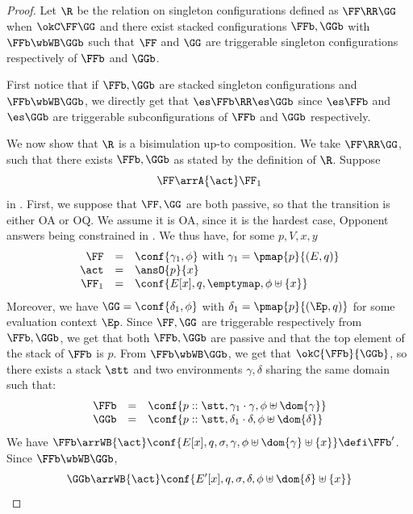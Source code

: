 \begin{proof}
  Let $\R$ be the relation on \AOGS singleton configurations
  defined as $\FF \RR \GG$ when
   $\okC \FF\GG$ and there exist stacked configurations $\FFb, \GGb$
    with $\FFb \wbWB \GGb$ such that 
    $\FF$ and $\GG$ are triggerable singleton configurations
    respectively of $\FFb$ and $\GGb$.

  First notice that if $\FFb, \GGb$ are stacked singleton configurations and 
  $\FFb \wbWB \GGb$, we directly get that 
  $\es\FFb \RR \es\GGb$ since $\es\FFb$ and $\es\GGb$ are 
  triggerable subconfigurations of $\FFb$ and $\GGb$ respectively.
  
  We now show that $\R$ is a bisimulation up-to composition.
  We take $\FF \RR \GG$, such that there exists $\FFb, \GGb$
  as stated by the definition of $\R$.
  Suppose 
  \begin{equation}
  \label{e:arrA-left}
   \FF \arrA{\act} \FF_1 
  \end{equation} 
  in \AOGS.  
  First, we suppose that $\FF,\GG$ are both passive, 
  so that the transition is either OA or OQ.  
  We assume it is OA, since it is the hardest case, 
  Opponent answers being constrained in \WBOGS.
  We thus have, for some $p,V,x,y$ 
  \[\begin{array}{rcl}
   \FF &=&  \conf{ \gamma_1, \phi} \mbox{ with }  \gamma_1 = \pmap{p}{(E,q)} \\
   \act & = & \ansO{p}{x} \\
   \FF_1 & = & \conf{E[x],q, \emptymap,\phi \uplus \{x\}}
  \end{array}\]
  Moreover, we have $\GG = \conf{\delta_1, \phi}$ 
  with $\delta_1 = \pmap{p}{(\Ep,q)}$ for some evaluation context $\Ep$.
  Since $\FF,\GG$ are triggerable respectively from $\FFb,\GGb$,
  we get that both $\FFb,\GGb$ are passive
  and that the top element of the stack of $\FFb$ is $p$.
  From $\FFb \wbWB \GGb$, we get that $\okC{\FFb}{\GGb}$,
  so there exists a stack $\stt$ and two environments $\gamma, \delta$ sharing the same domain such that:  
  \[\begin{array}{rcl}
  \FFb & = & \conf{p::\stt,\gamma_1 \cdot \gamma,\phi \uplus \dom{\gamma}} \\ 
  \GGb & = & \conf{p::\stt,\delta_1 \cdot \delta,\phi \uplus \dom{\delta}} 
  \end{array}\]
  We have 
  $\FFb \arrWB{\act} \conf{E[x],q,\sigma, \gamma, \phi\uplus \dom{\gamma} \uplus \{x\}} 
  \defi \FFb'$. 
  Since $\FFb \wbWB \GGb$, 
  \[\GGb  \arrWB{\act} \conf{E'[x],q,\sigma, \delta, \phi \uplus \dom{\delta} \uplus \{x\}}  
\]
\end{proof}

